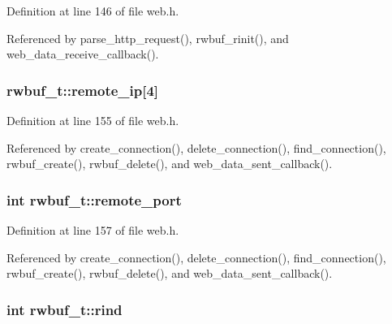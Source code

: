 Definition at line 146 of file web.\+h.



Referenced by parse\+\_\+http\+\_\+request(), rwbuf\+\_\+rinit(), and web\+\_\+data\+\_\+receive\+\_\+callback().

\subsubsection[{\texorpdfstring{remote\+\_\+ip}{remote_ip}}]{ rwbuf\+\_\+t\+::remote\+\_\+ip\mbox{[}4\mbox{]}}\hypertarget{structrwbuf__t_ad83926198e358ac1a569b0da7749572c}{}\label{structrwbuf__t_ad83926198e358ac1a569b0da7749572c}


Definition at line 155 of file web.\+h.



Referenced by create\+\_\+connection(), delete\+\_\+connection(), find\+\_\+connection(), rwbuf\+\_\+create(), rwbuf\+\_\+delete(), and web\+\_\+data\+\_\+sent\+\_\+callback().

\subsubsection[{\texorpdfstring{remote\+\_\+port}{remote_port}}]{\setlength{\rightskip}{0pt plus 5cm}int rwbuf\+\_\+t\+::remote\+\_\+port}\hypertarget{structrwbuf__t_aace1e79a985cc8fab4c2093208bf3763}{}\label{structrwbuf__t_aace1e79a985cc8fab4c2093208bf3763}


Definition at line 157 of file web.\+h.



Referenced by create\+\_\+connection(), delete\+\_\+connection(), find\+\_\+connection(), rwbuf\+\_\+create(), rwbuf\+\_\+delete(), and web\+\_\+data\+\_\+sent\+\_\+callback().

\subsubsection[{\texorpdfstring{rind}{rind}}]{\setlength{\rightskip}{0pt plus 5cm}int rwbuf\+\_\+t\+::rind}\hypertarget{structrwbuf__t_ad5cbf7a78a5f5d9aa75b38f90e0fb6af}{}\label{structrwbuf__t_ad5cbf7a78a5f5d9aa75b38f90e0fb6af}



